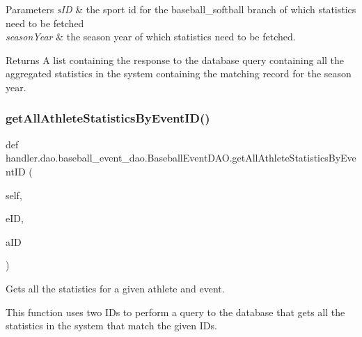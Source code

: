 \begin{DoxyParams}{Parameters}
{\em s\+ID} & the sport id for the baseball\+\_\+softball branch of which statistics need to be fetched \\
\hline
{\em season\+Year} & the season year of which statistics need to be fetched.\\
\hline
\end{DoxyParams}
\begin{DoxyReturn}{Returns}
A list containing the response to the database query containing all the aggregated statistics in the system containing the matching record for the season year. 
\end{DoxyReturn}
\mbox{\label{classhandler_1_1dao_1_1baseball__event__dao_1_1_baseball_event_d_a_o_a34037efa7d848d789874181636da0075}} 
\subsubsection{\texorpdfstring{get\+All\+Athlete\+Statistics\+By\+Event\+I\+D()}{getAllAthleteStatisticsByEventID()}}
{\footnotesize\ttfamily def handler.\+dao.\+baseball\+\_\+event\+\_\+dao.\+Baseball\+Event\+D\+A\+O.\+get\+All\+Athlete\+Statistics\+By\+Event\+ID (\begin{DoxyParamCaption}\item[{}]{self,  }\item[{}]{e\+ID,  }\item[{}]{a\+ID }\end{DoxyParamCaption})}



Gets all the statistics for a given athlete and event. 

This function uses two I\+Ds to perform a query to the database that gets all the statistics in the system that match the given I\+Ds.


